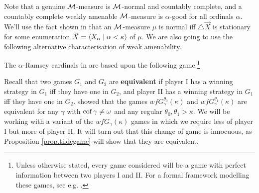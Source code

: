 \documentclass[../main]{subfiles}
\begin{document}
Note that a genuine $\operatorname{\mathcal M}$-measure is $\operatorname{\mathcal M}$-normal and countably complete, and a countably complete weakly amenable $\operatorname{\mathcal M}$-measure is $\alpha$-good for all ordinals $\alpha$. We'll use the fact shown in \cite{HolySchlicht} that an $\operatorname{\mathcal M}$-measure $\mu$ is normal iff $\triangle\vec X$ is stationary for some enumeration $\vec X=\langle X_\alpha\mid\alpha<\kappa\rangle$ of $\mu$. We are also going to use the following alternative characterisation of weak amenability.


The $\alpha$-Ramsey cardinals in \cite{HolySchlicht} are based upon the following game.\footnote{Unless otherwise stated, every game considered will be a game with perfect information between two players I and II. For a formal framework modelling these games, see e.g. \cite{Kanamori}.}


Recall that two games $G_1$ and $G_2$ are \textbf{equivalent} if player I has a winning strategy in $G_1$ iff they have one in $G_2$, and player II has a winning strategy in $G_1$ iff they have one in $G_2$. \cite{HolySchlicht} showed that the games $wfG_\gamma^{\theta_0}(\kappa)$ and $wfG_\gamma^{\theta_1}(\kappa)$ are equivalent for any $\gamma$ with $\operatorname{cof}\gamma\neq\omega$ and any regular $\theta_0,\theta_1>\kappa$. We will be working with a variant of the $wfG_\gamma(\kappa)$ games in which we require less of player I but more of player II. It will turn out that this change of game is innocuous, as Proposition \ref{prop.tildegame} will show that they are equivalent.
\end{document}
